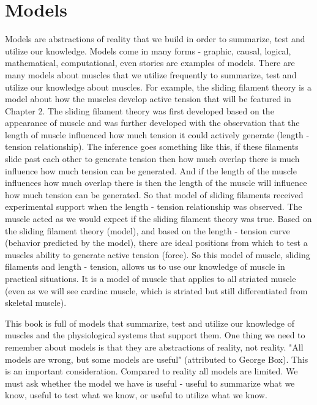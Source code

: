 \section{Models}

Models are abstractions of reality that we build in order to summarize, test and utilize our knowledge. Models come in many forms - graphic, causal, logical, mathematical, computational, even stories are examples of models. There are many models about muscles that we utilize frequently to summarize, test and utilize our knowledge about muscles. For example, the sliding filament theory is a model about how the muscles develop active tension that will be featured in Chapter 2. The sliding filament theory was first developed based on the appearance of muscle and was further developed with the observation that the length of muscle influenced how much tension it could actively generate (length - tension relationship). The inference goes something like this, if these filaments slide past each other to generate tension then how much overlap there is much influence how much tension can be generated. And if the length of the muscle influences how much overlap there is then the length of the muscle will influence how much tension can be generated. So that model of sliding filaments received experimental support when the length - tension relationship was observed. The muscle acted as we would expect if the sliding filament theory was true. Based on the sliding filament theory (model), and based on the length - tension curve (behavior predicted by the model), there are ideal positions from which to test a muscles ability to generate active tension (force). So this model of muscle, sliding filaments and length - tension, allows us to use our knowledge of muscle in practical situations. It is a model of muscle that applies to all striated muscle (even as we will see cardiac muscle, which is striated but still differentiated from skeletal muscle).

This book is full of models that summarize, test and utilize our knowledge of muscles and the physiological systems that support them. One thing we need to remember about models is that they are abstractions of reality, not reality. "All models are wrong, but some models are useful" (attributed to George Box). This is an important consideration. Compared to reality all models are limited. We must ask whether the model we have is useful - useful to summarize what we know, useful to test what we know, or useful to utilize what we know. 

